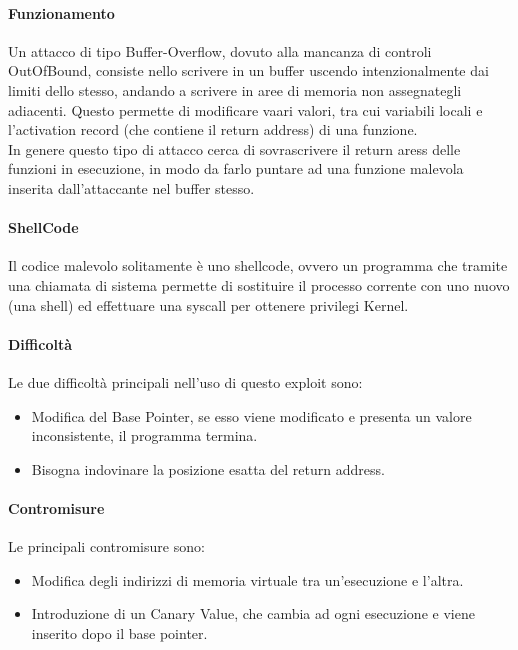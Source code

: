 \documentclass[12pt, a4paper, openany]{book}
\begin{document}
\paragraph*{Funzionamento}
Un attacco di tipo Buffer-Overflow, dovuto alla mancanza di controli OutOfBound, consiste nello scrivere in un buffer uscendo intenzionalmente dai limiti dello stesso, andando a scrivere in aree di memoria non assegnategli adiacenti.
Questo permette di modificare vaari valori, tra cui variabili locali e l'activation record (che contiene il return address) di una funzione.
\\In genere questo tipo di attacco cerca di sovrascrivere il return aress delle funzioni in esecuzione, in modo da farlo puntare ad una funzione malevola inserita dall'attaccante nel buffer stesso.

\paragraph*{ShellCode} Il codice malevolo solitamente è uno shellcode, ovvero un programma che tramite una chiamata di sistema permette di sostituire il processo corrente con uno nuovo (una shell) ed effettuare una syscall per ottenere privilegi Kernel.
\paragraph*{Difficoltà} Le due difficoltà principali nell'uso di questo exploit sono:
\begin{itemize}
    \item Modifica del Base Pointer, se esso viene modificato e presenta un valore inconsistente, il programma termina.
    \item Bisogna indovinare la posizione esatta del return address.
\end{itemize}
\paragraph*{Contromisure}
Le principali contromisure sono:
\begin{itemize}
    \item Modifica degli indirizzi di memoria virtuale tra un'esecuzione e l'altra.
    \item Introduzione di un Canary Value, che cambia ad ogni esecuzione e viene inserito dopo il base pointer.
\end{itemize}
\end{document}
